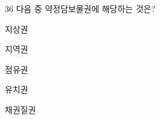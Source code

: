 \begin{question}{36}
다음 중 약정담보물권에 해당하는 것은?
\begin{choices}
  \item 지상권
  \item 지역권
  \item 점유권
  \item 유치권
  \item 채권질권
\end{choices}
\end{question}
